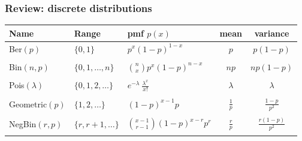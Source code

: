 \documentclass[slidestop,compress,mathserif]{beamer}
\begin{document}
\begin{frame}\frametitle{Review: discrete distributions}

\begin{center}
\begin{tabular}{lllcc}
\hline
Name 								& Range 			& pmf $p(x)$																& mean 						& variance \\
\hline
Ber$(p)$							& $\{0, 1\}$			& $p^x (1-p)^{1-x}$														& $p$						& $p(1-p)$\\
&&&&\\
Bin$(n, p)$				& $\{0, 1, \ldots, n\}$	& ${n \choose x} p^x (1-p)^{n-x}$											& $np$						& $np(1-p)$\\
&&&&\\
Pois$(\lambda)$		& $\{0, 1, 2, \ldots\}$	& $e^{-\lambda}\ \frac{\lambda^x}{x!}$										& $\lambda$				& $\lambda$\\
&&&&\\
Geometric$(p)$		& $\{1, 2, \ldots\}$	& $(1-p)^{x-1}p$															& $\frac{1}{p}$				& $\frac{1-p}{p^2}$\\
&&&&\\
NegBin$(r, p)$			& $\{r, r+1, \ldots\}$	& ${x - 1 \choose r - 1}(1-p)^{x-r}p^{r}$									& $\frac{r}{p}$				& $\frac{r(1-p)}{p^2}$\\ \hline
&&&&\\
\end{tabular}
\end{center}

\end{frame}
\end{document}
